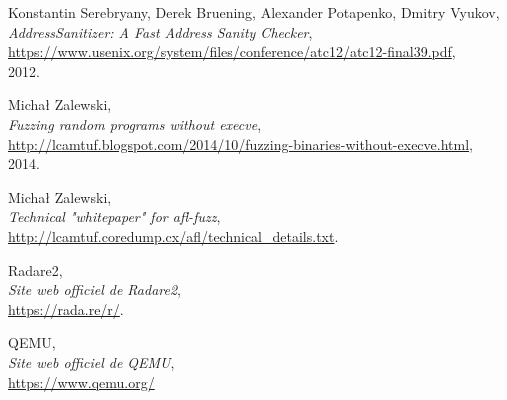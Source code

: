 \begin{thebibliography}{9}

  Konstantin Serebryany, Derek Bruening, Alexander Potapenko, Dmitry Vyukov, \\
  \textit{AddressSanitizer: A Fast Address Sanity Checker}, \\
  \url{https://www.usenix.org/system/files/conference/atc12/atc12-final39.pdf}, \\
	2012.

  Michał Zalewski, \\
  \textit{Fuzzing random programs without execve}, \\
  \url{http://lcamtuf.blogspot.com/2014/10/fuzzing-binaries-without-execve.html}, \\
  2014.

  Michał Zalewski, \\
  \textit{Technical "whitepaper" for afl-fuzz}, \\
  \url{http://lcamtuf.coredump.cx/afl/technical_details.txt}.

  Radare2, \\
  \textit{Site web officiel de Radare2}, \\
  \url{https://rada.re/r/}.

  QEMU, \\
  \textit{Site web officiel de QEMU}, \\
  \url{https://www.qemu.org/}

\end{thebibliography}
